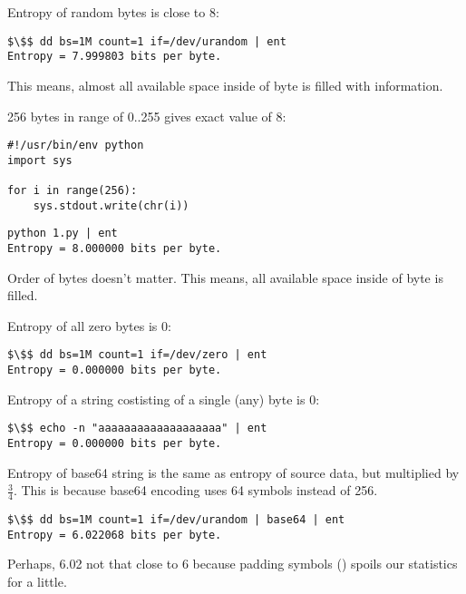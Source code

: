 Entropy of random bytes is close to 8:

\begin{lstlisting}[basicstyle=\ttfamily, mathescape]
$\$$ dd bs=1M count=1 if=/dev/urandom | ent
Entropy = 7.999803 bits per byte.
\end{lstlisting}

This means, almost all available space inside of byte is filled with information.

256 bytes in range of 0..255 gives exact value of 8:

\begin{lstlisting}[basicstyle=\ttfamily, mathescape,style=custompy]
#!/usr/bin/env python
import sys

for i in range(256):
    sys.stdout.write(chr(i))
\end{lstlisting}

\begin{lstlisting}[basicstyle=\ttfamily, mathescape]
python 1.py | ent
Entropy = 8.000000 bits per byte.
\end{lstlisting}

Order of bytes doesn't matter.
This means, all available space inside of byte is filled.

Entropy of all zero bytes is 0:

\begin{lstlisting}[basicstyle=\ttfamily, mathescape]
$\$$ dd bs=1M count=1 if=/dev/zero | ent
Entropy = 0.000000 bits per byte.
\end{lstlisting}

Entropy of a string costisting of a single (any) byte is 0:

\begin{lstlisting}[basicstyle=\ttfamily, mathescape]
$\$$ echo -n "aaaaaaaaaaaaaaaaaaa" | ent
Entropy = 0.000000 bits per byte.
\end{lstlisting}

Entropy of base64 string is the same as entropy of source data, but multiplied by $\frac{3}{4}$.
This is because base64 encoding uses 64 symbols instead of 256.

\begin{lstlisting}[basicstyle=\ttfamily, mathescape]
$\$$ dd bs=1M count=1 if=/dev/urandom | base64 | ent
Entropy = 6.022068 bits per byte.
\end{lstlisting}

Perhaps, 6.02 not that close to 6 because padding symbols (\TT{=}) spoils our statistics for a little.

